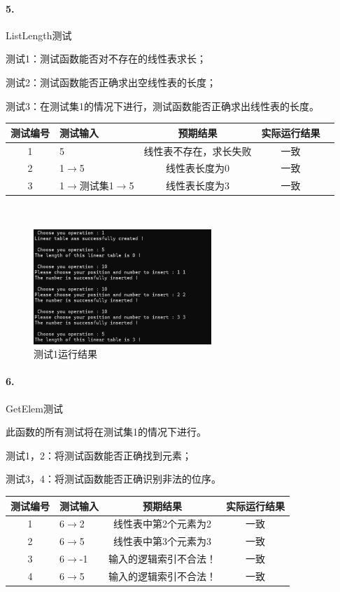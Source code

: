 \documentclass[supercite]{Experimental_Report}
\theoremstyle{definition}
\begin{document}
\paragraph{ 5.}ListLength测试


测试1：测试函数能否对不存在的线性表求长；

测试2：测试函数能否正确求出空线性表的长度；

测试3：在测试集1的情况下进行，测试函数能否正确求出线性表的长度。

\vspace{0.5em}

\begin{tabular}{|c|l|c|c|c|}
	\hline
	测试编号 & 测试输入 & 预期结果 & 实际运行结果 \\
	\hline
	1 & 5 & 线性表不存在，求长失败 & 一致 \\
	\hline
	2 & 1$\rightarrow$5 & 线性表长度为0 & 一致 \\
	\hline
	3 & 1$\rightarrow$测试集1$\rightarrow$5 & 线性表长度为3 & 一致 \\
	\hline
\end{tabular}

~\

 \begin{figure}[H]
 	\centering
 	\includegraphics[width=0.6\textwidth]{images/线性表测试5.png}
 	\caption{测试1运行结果}
 	\label{txlab}
 \end{figure}


\paragraph{ 6.}GetElem测试

此函数的所有测试将在测试集1的情况下进行。

测试1，2：将测试函数能否正确找到元素；

测试3，4：将测试函数能否正确识别非法的位序。

\vspace{0.5em}

\begin{tabular}{|c|l|c|c|}
	\hline
	测试编号 & 测试输入 & 预期结果 & 实际运行结果 \\
	\hline
	1 & 6$\rightarrow$2 & 线性表中第2个元素为2 & 一致 \\
	\hline
	2 & 6$\rightarrow$5 & 线性表中第3个元素为3 & 一致 \\
	\hline
	3 & 6$\rightarrow$-1 & 输入的逻辑索引不合法！ & 一致 \\
	\hline
	4 & 6$\rightarrow$5 & 输入的逻辑索引不合法！ & 一致 \\
	\hline
\end{tabular}
\end{document}
